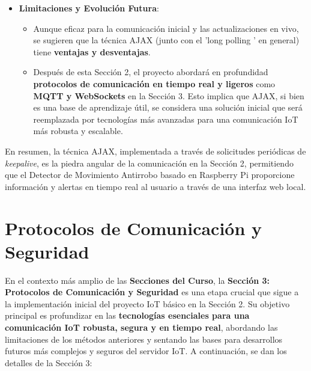 \documentclass{report}
\begin{document}
\begin{itemize}
    \item \textbf{Limitaciones y Evolución Futura}:
    \begin{itemize}
        \item Aunque eficaz para la comunicación inicial y las actualizaciones en vivo, se  sugieren que la técnica AJAX (junto con el 
        'long polling ' en general) tiene \textbf{ventajas y desventajas}.
        \item Después de esta Sección 2, el proyecto abordará en profundidad \textbf{protocolos de comunicación en tiempo real y ligeros} como 
        \textbf{MQTT y WebSockets} en la Sección 3. Esto implica que AJAX, si bien es una base de aprendizaje útil, se considera una solución 
        inicial que será reemplazada por tecnologías más avanzadas para una comunicación IoT más robusta y escalable.
    \end{itemize}
\end{itemize}
En resumen, la técnica AJAX, implementada a través de solicitudes periódicas de \textit{keepalive}, es la piedra angular de la comunicación en la 
Sección 2, permitiendo que el Detector de Movimiento Antirrobo basado en Raspberry Pi proporcione información y alertas en tiempo real al usuario a 
través de una interfaz web local.

\section{Protocolos de Comunicación y Seguridad}
En el contexto más amplio de las \textbf{Secciones del Curso}, la \textbf{Sección 3: Protocolos de Comunicación y Seguridad} es una etapa crucial que 
sigue a la implementación inicial del proyecto IoT básico en la Sección 2. Su objetivo principal es profundizar en las \textbf{tecnologías esenciales 
para una comunicación IoT robusta, segura y en tiempo real}, abordando las limitaciones de los métodos anteriores y sentando las bases para desarrollos 
futuros más complejos y seguros del servidor IoT. A continuación, se dan los detalles de la Sección 3:
\end{document}
